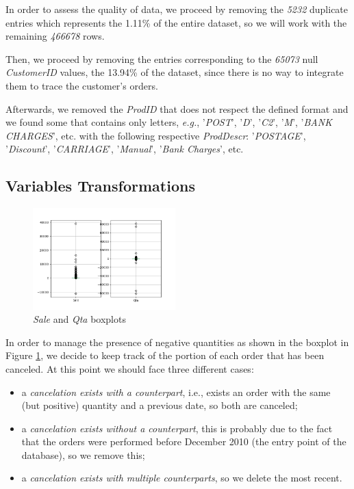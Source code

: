 In order to assess the quality of data, we proceed by removing the \emph{5232} duplicate entries which represents the 1.11\% of the entire dataset, so we will work with the remaining \emph{466678} rows.

Then, we proceed by removing the entries corresponding to the \emph{65073} null \emph{CustomerID} values, the 13.94\% of the dataset, since there is no way to integrate them to trace the customer's orders.

Afterwards, we removed the \emph{ProdID} that does not respect the defined format and we found some that contains only letters, \emph{e.g.}, '\emph{POST}', '\emph{D}', '\emph{C2}', '\emph{M}', '\emph{BANK CHARGES}', etc. with the following respective \emph{ProdDescr}: '\emph{POSTAGE}', '\emph{Discount}', '\emph{CARRIAGE}', '\emph{Manual}', '\emph{Bank Charges}', etc.

\subsection{Variables Transformations}

\begin{figure}
\centering
\includegraphics[width=0.49\textwidth]{img/boxplot_before.png}
\caption{\emph{Sale} and \emph{Qta} boxplots}
\label{fig:original_sale_qta_boxplots}
\end{figure}

In order to manage the presence of negative quantities as shown in the boxplot in Figure \ref{fig:original_sale_qta_boxplots}, we decide to keep track of the portion of each order that has been canceled. At this point we should face three different cases:

\begin{itemize}
\item a \emph{cancelation exists with a counterpart}, i.e., exists an order with the same (but positive) quantity and a previous date, so both are canceled;
\item a \emph{cancelation exists without a counterpart}, this is probably due to the fact that the orders were performed before December 2010 (the entry point of the database), so we remove this;
\item a \emph{cancelation exists with multiple counterparts}, so we delete the most recent.
\end{itemize}

